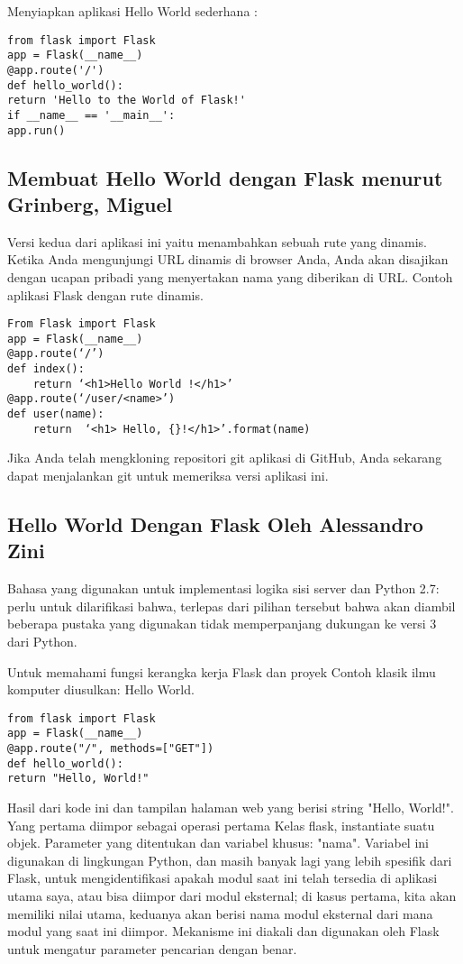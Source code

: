 \documentclass[12pt]{article}
\begin{document}
Menyiapkan aplikasi Hello World sederhana :
\begin{verbatim}
from flask import Flask
app = Flask(__name__)
@app.route('/')
def hello_world():
return 'Hello to the World of Flask!'
if __name__ == '__main__':
app.run()
\end{verbatim}

\subsection{Membuat Hello World dengan Flask menurut Grinberg, Miguel}
Versi kedua dari aplikasi ini yaitu menambahkan sebuah rute yang dinamis. Ketika Anda mengunjungi URL dinamis di browser Anda, Anda akan disajikan dengan ucapan pribadi yang menyertakan nama yang diberikan di URL. Contoh aplikasi Flask dengan rute dinamis.
\begin{verbatim}
From Flask import Flask
app = Flask(__name__)
@app.route(‘/’)
def index():
	return ‘<h1>Hello World !</h1>’
@app.route(‘/user/<name>’)
def user(name):
	return  ‘<h1> Hello, {}!</h1>’.format(name)

\end{verbatim}
Jika Anda telah mengkloning repositori git aplikasi di GitHub, Anda sekarang dapat menjalankan git untuk memeriksa versi aplikasi ini\cite{grinberg2018flask}.

\subsection{Hello World Dengan Flask Oleh Alessandro Zini}

Bahasa yang digunakan untuk implementasi logika sisi server dan Python 2.7: perlu untuk dilarifikasi bahwa, terlepas dari pilihan tersebut bahwa akan diambil beberapa pustaka yang digunakan tidak memperpanjang dukungan ke versi 3 dari Python.

Untuk memahami fungsi kerangka kerja Flask dan proyek Contoh klasik ilmu komputer diusulkan: Hello World.

\begin{verbatim}
from flask import Flask
app = Flask(__name__)
@app.route("/", methods=["GET"])
def hello_world():
return "Hello, World!"
\end{verbatim}

Hasil dari kode ini dan tampilan halaman web yang berisi string "Hello, World!". Yang pertama diimpor sebagai operasi pertama Kelas flask, instantiate suatu objek. Parameter yang ditentukan dan variabel khusus: "nama".  Variabel ini digunakan di lingkungan Python, dan masih banyak lagi yang lebih spesifik dari Flask, untuk mengidentifikasi apakah modul saat ini telah tersedia di aplikasi utama saya, atau bisa diimpor dari modul eksternal; di kasus pertama, kita akan memiliki nilai utama, keduanya akan berisi nama modul eksternal dari mana modul yang saat ini diimpor. Mekanisme ini diakali dan digunakan oleh Flask untuk mengatur parameter pencarian dengan benar\cite{ziniqr}.
\end{document}
